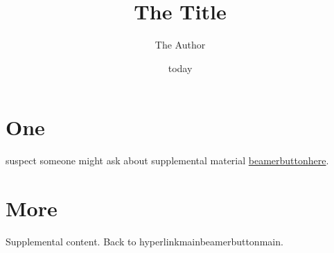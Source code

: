 \documentclass{beamer}
\title{The Title}
\author{The Author}
\date{today}
\begin{document}
\section{One}
\begin{frame}[label=main]
suspect someone might ask about supplemental material
\hyperlink{supplemental}{beamerbutton{here}}.
\end{frame}
\appendix
\section{More}
\begin{frame}[label=supplemental]
Supplemental content.
Back to hyperlink{main}{beamerbutton{main}}.
\end{frame}
\end{document}
